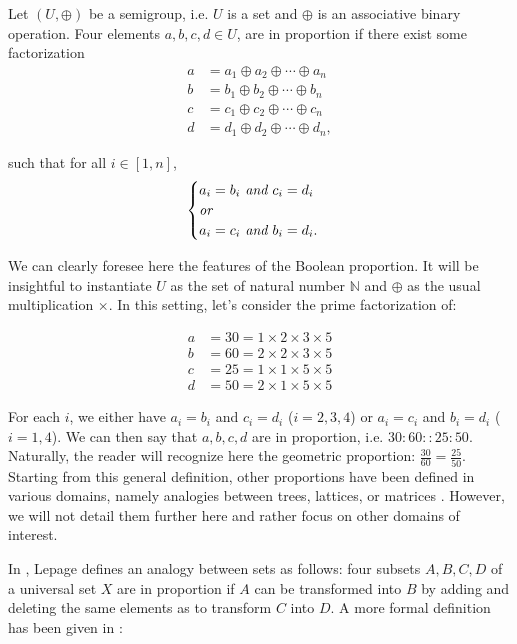 \begin{definition}
\label{DEF:proportion_semi_group}
Let $(U, \oplus)$ be a semigroup, i.e. $U$ is a set and $\oplus$ is an
  associative binary operation. Four elements $a, b, c, d \in U$, are in proportion if
  there exist some factorization
  \begin{align*}
    a &= a_1 \oplus a_2 \oplus \cdots \oplus a_n\\
    b &= b_1 \oplus b_2 \oplus \cdots \oplus b_n\\
    c &= c_1 \oplus c_2 \oplus \cdots \oplus c_n\\
    d &= d_1 \oplus d_2 \oplus \cdots \oplus d_n,
  \end{align*}

  such that for all $i \in [1, n]$, 
  $$
  \begin{cases}
    a_i = b_i \emph{ and } c_i = d_i\\
    \emph{or}\\
    a_i = c_i \emph{ and } b_i = d_i.
  \end{cases}
  $$
\end{definition}

We can clearly foresee here the features of the Boolean proportion. It will be
insightful to instantiate $U$ as the set of natural number $\mathbb{N}$ and
$\oplus$ as the usual multiplication $\times$. In this setting, let's consider
the prime factorization of:

\begin{align*}
  a &= 30 = 1 \times 2 \times 3 \times 5\\
  b &= 60 = 2 \times 2 \times 3 \times 5\\
  c &= 25 = 1 \times 1 \times 5 \times 5\\
  d &= 50 = 2 \times 1 \times 5 \times 5
\end{align*}

For each $i$, we either have $a_i = b_i$ and $c_i = d_i$ ($i = 2, 3, 4$) or
$a_i = c_i$ and $b_i = d_i$ ($i = 1, 4$). We can then say that $a, b, c, d$ are
in proportion, i.e. $30: 60 :: 25:50$. Naturally, the reader will recognize
here the geometric proportion: $\frac{30}{60} = \frac{25}{50}$.
Starting from this general definition, other proportions have been defined in
various domains, namely analogies between trees, lattices, or matrices
\cite{MicDel04, StrYvoREPORT05, MicBayDelJAIR08}. However, we will not detail
them further here and rather focus on other domains of interest.

In \cite{Lep03}, Lepage defines an analogy between sets as follows: four subsets
$A, B, C, D$ of a universal set $X$ are in proportion if $A$ can be transformed
into $B$ by adding and deleting the same elements as to transform $C$ into $D$.
A more formal definition has been given in \cite{StrYvoREPORT05}:

